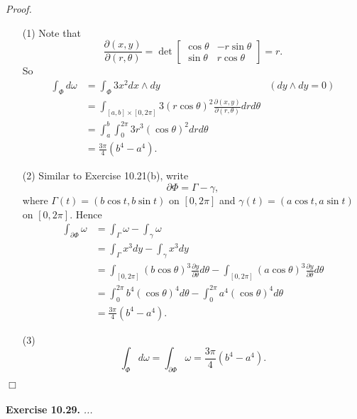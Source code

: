 \documentclass{article}
\begin{document}
\emph{Proof.}
\begin{enumerate}
\item[(1)]
  Note that
  \[
    \frac{\partial(x,y)}{\partial(r,\theta)}
    =
    \det
    \begin{bmatrix}
      \cos\theta & -r\sin\theta \\
      \sin\theta & r\cos\theta
    \end{bmatrix}
    = r.
  \]
  So
  \begin{align*}
    \int_{\Phi} d\omega
    &= \int_{\Phi} 3x^2 dx \wedge dy
      &(dy \wedge dy = 0) \\
    &= \int_{[a,b]\times[0,2\pi]} 3(r\cos\theta)^2
      \frac{\partial(x,y)}{\partial(r,\theta)} dr d\theta \\
    &= \int_{a}^{b} \int_{0}^{2\pi} 3 r^3 (\cos\theta)^2 dr d\theta \\
    &= \frac{3\pi}{4}(b^4-a^4).
  \end{align*}

\item[(2)]
  Similar to Exercise 10.21(b),
  write
  \[
    \partial \Phi = \Gamma - \gamma,
  \]
  where $\Gamma(t) = (b\cos t,b\sin t)$ on $[0,2\pi]$
  and $\gamma(t) = (a\cos t,a\sin t)$ on $[0,2\pi]$.
  Hence
  \begin{align*}
    \int_{\partial\Phi} \omega
    &= \int_{\Gamma} \omega - \int_{\gamma} \omega \\
    &= \int_{\Gamma} x^3 dy - \int_{\gamma} x^3 dy \\
    &= \int_{[0,2\pi]} (b\cos\theta)^3 \frac{\partial y}{\partial \theta}d\theta
      - \int_{[0,2\pi]} (a\cos\theta)^3 \frac{\partial y}{\partial \theta}d\theta \\
    &= \int_{0}^{2\pi} b^4 (\cos\theta)^4 d\theta
      - \int_{0}^{2\pi} a^4 (\cos\theta)^4 d\theta \\
    &= \frac{3\pi}{4}(b^4-a^4).
  \end{align*}

\item[(3)]
  \[
    \int_{\Phi} d\omega
    = \int_{\partial\Phi} \omega
    = \frac{3\pi}{4}(b^4-a^4).
  \]
\end{enumerate}
$\Box$ \\\\






\textbf{Exercise 10.29.}
\emph{...} \\
\end{document}
